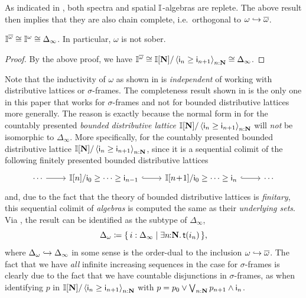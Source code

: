 \begin{remark}
  As indicated in , both spectra and spatial $\mathbb{I}$-algebras are replete. The above result then implies that they are also chain complete, i.e.\ orthogonal to $\omega\hookrightarrow\overline{\omega}$.
\end{remark}

\begin{corollary}[\AxiomNT, \AxiomSQCC]
  $\mathbb{I}^{\overline{\omega}} \cong \mathbb{I}^\omega \cong \Delta_\infty$. In particular, $\omega$ is not sober.
\end{corollary}
\begin{proof}
  By the above proof, we have $\mathbb{I}^{\overline{\omega}} \cong \mathbb{I}[\mathbf{N}]/\left\langle\mathsf{i}_n \ge \mathsf{i}_{n+1}\right\rangle_{n:\mathbf{N}} \cong \Delta_\infty$.
\end{proof}

\begin{remark}\label{rem:whynotdis}
  Note that the inductivity of $\omega$ as shown in  is \emph{independent} of working with distributive lattices or $\sigma$-frames. The completeness result shown in  is the only one in this paper that works for $\sigma$-frames and not for bounded distributive lattices more generally. The reason is exactly because the normal form in  for the countably presented \emph{bounded distributive lattice} $\mathbb{I}[\mathbf{N}]/\left\langle\mathsf{i}_n \ge \mathsf{i}_{n+1}\right\rangle_{n:\mathbf{N}}$ will \emph{not} be isomorphic to $\Delta_\infty$. More specifically, for the countably presented bounded distributive lattice $\mathbb{I}[\mathbf{N}]/\left\langle\mathsf{i}_n \ge \mathsf{i}_{n+1}\right\rangle_{n:\mathbf{N}}$, since it is a sequential colimit of the following finitely presented bounded distributive lattices
  \[ 
  \begin{tikzcd}
    \cdots \ar[r] & \I[n]/\ms{i}_{0} \ge \cdots \ge \ms{i}_{n-1} \ar[r, hook] & \I[n\!+\!1]/\ms{i}_0 \ge \cdots \ge \ms{i}_n \ar[r, hook] & \cdots
  \end{tikzcd}
  \]
  and, due to the fact that the theory of bounded distributive lattices is \emph{finitary}, this sequential colimit of \emph{algebras} is computed the same as their \emph{underlying sets}. Via , the result can be identified as the subtype of $\Delta_\infty$,
  \[ \Delta_\omega \coloneq \scomp{i : \Delta_\infty}{\ex n\N \ist{i_n}}\text{,} \]
  where $\Delta_\omega \hookrightarrow \Delta_\infty$ in some sense is the order-dual to the inclusion $\omega\hookrightarrow\overline{\omega}$. The fact that we have \emph{all} infinite increasing sequences in the case for $\sigma$-frames is clearly due to the fact that we have countable disjunctions in $\sigma$-frames, as when identifying $p$ in $\mathbb{I}[\mathbf{N}]/\left\langle\mathsf{i}_n \ge \mathsf{i}_{n+1}\right\rangle_{n:\mathbf{N}}$ with $p = p_0 \vee \bigvee_{n:\mathbf{N}}p_{n+1}\wedge \mathsf{i}_n$.
\end{remark}


